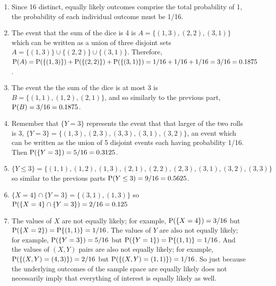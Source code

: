 \documentclass[
]{book}
\providecommand{\tightlist}{%
  \setlength{\itemsep}{0pt}\setlength{\parskip}{0pt}}
\theoremstyle{definition}
\theoremstyle{definition}
\theoremstyle{definition}
\theoremstyle{remark}
\begin{document}
\begin{enumerate}
\def\labelenumi{\arabic{enumi}.}
\tightlist
\item
  Since 16 distinct, equally likely outcomes comprise the total probability of 1, the probability of each individual outcome must be 1/16.
\item
  The event that the sum of the dice is 4 is \(A = \{(1, 3), (2, 2), (3, 1)\}\) which can be written as a union of three disjoint sets \(A = \{(1, 3)\} \cup \{(2, 2)\} \cup \{(3, 1)\}\). Therefore, \(\textrm{P}(A) = \textrm{P}(\{(1, 3)\}) + \textrm{P}(\{(2, 2)\}) + \textrm{P}(\{(3, 1)\}) = 1/16 + 1/16 + 1/16 = 3/16 = 0.1875\).
\item
  The event the the sum of the dice is at most 3 is \(B=\{(1, 1), (1, 2), (2, 1)\}\), and so similarly to the previous part, \(\textrm{P}(B) = 3/16=0.1875\).
\item
  Remember that \(\{Y=3\}\) represents the event that that larger of the two rolls is 3, \(\{Y=3\}=\{(1, 3), (2, 3), (3, 3), (3, 1), (3, 2)\}\), an event which can be written as the union of 5 disjoint events each having probability 1/16. Then \(\textrm{P}(\{Y = 3\}) = 5/16=0.3125\).
\item
  \(\{Y \le 3\}=\{(1, 1), (1, 2), (1, 3), (2, 1), (2, 2), (2, 3), (3, 1), (3, 2), (3, 3)\}\) so similar to the previous parts \(\textrm{P}(Y \le 3) = 9/16=0.5625\).
\item
  \(\{X = 4\}\cap \{Y = 3\} = \{(3, 1), (1, 3)\}\) so \(\textrm{P}(\{X = 4\}\cap \{Y = 3\})= 2/16 = 0.125\)
\item
  The values of \(X\) are not equally likely; for example, \(\textrm{P}(\{X=4\}) = 3/16\) but \(\textrm{P}(\{X=2\})=\textrm{P}\{(1, 1)\} = 1/16\). The values of \(Y\) are also not equally likely; for example, \(\textrm{P}(\{Y=3\})=5/16\) but \(\textrm{P}(\{Y=1\})= \textrm{P}\{(1, 1)\} = 1/16\). And the values of \((X, Y)\) pairs are also not equally likely; for example, \(\textrm{P}(\{(X, Y) = (4, 3)\}) = 2/16\) but \(\textrm{P}(\{(X,Y) = (1, 1)\}) = 1/16\). So just because the underlying outcomes of the sample space are equally likely does not necessarily imply that everything of interest is equally likely as well.
\end{enumerate}
\end{document}
